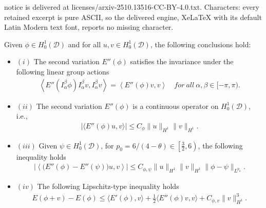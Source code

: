 \documentclass[10pt,a4paper]{amsart}
\begin{document}
notice is delivered at licenses/arxiv-2510.13516-CC-BY-4.0.txt. Characters: every retained excerpt is pure ASCII, so the delivered engine, XeLaTeX with its default Latin Modern text font, reports no missing character.
\begin{prop}\label{Property-of-E''}
	Given $\phi\in H_0^1(\mathcal{D})$ and for all $u, v\in H_0^1(\mathcal{D})$, the following conclusions hold:
	\begin{itemize}[label={}, labelsep=0pt, leftmargin=*]
		\item $(i)$ {The second variation} $E''(\phi)$ satisfies the invariance under the following linear group actions
		\begin{align*}
			\left\langle E''(I_{\alpha}^{\beta}\phi)I_{\alpha}^{\beta}v,I_{\alpha}^{\beta}v\right\rangle=\left\langle E''(\phi)v,v\right\rangle \quad for\ all\ \alpha,\beta\in[-\pi, \pi). 
		\end{align*}
		\item $(ii)$ {The second variation} $E''(\phi)$ is a continuous operator on $H_0^1(\mathcal{D})$, i.e.,
		\begin{align*}
			\left|\big\langle E''(\phi)u,v\big\rangle\right|\le C_{\phi}\|u\|_{H^1}\|v\|_{H^1}.
		\end{align*}
		\item $(iii)$ Given $\psi\in H_0^1(\mathcal{D})$, for {$p_0=6/(4-\theta)\in\left[\frac{3}{2},6\right)$}, the following inequality holds
		\begin{align*}
			\left|\left\langle \big(E''(\phi)-E''(\psi)\big)u,v\right\rangle\right|\le C_{\phi,\psi}\|u\|_{H^1}\|v\|_{H^1}\|\phi-\psi\|_{L^{p_0}}.
		\end{align*}
		\item $(iv)$ The following Lipschitz-type inequality holds
		\begin{align*}
			E(\phi+v)-E(\phi)\le \big\langle E'(\phi),v\big\rangle+\frac{1}{2}\big\langle E''(\phi)v,v\big\rangle+C_{\phi,v}\|v\|^3_{H^1}.
		\end{align*}
	\end{itemize}
\end{prop}
\end{document}
